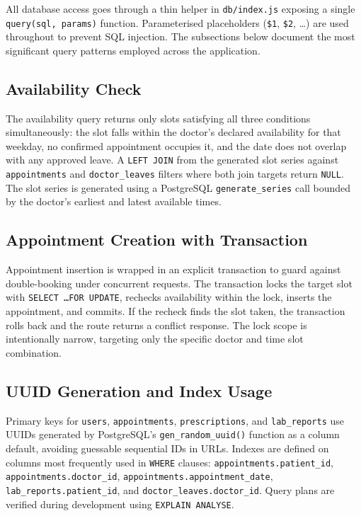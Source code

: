\justifying
\noindent All database access goes through a thin helper in \texttt{db/index.js} exposing a single \texttt{query(sql, params)} function. Parameterised placeholders (\texttt{\$1}, \texttt{\$2}, \ldots) are used throughout to prevent SQL injection. The subsections below document the most significant query patterns employed across the application.

\subsection{Availability Check}

\justifying
\noindent The availability query returns only slots satisfying all three conditions simultaneously: the slot falls within the doctor's declared availability for that weekday, no confirmed appointment occupies it, and the date does not overlap with any approved leave. A \texttt{LEFT JOIN} from the generated slot series against \texttt{appointments} and \texttt{doctor\_leaves} filters where both join targets return \texttt{NULL}. The slot series is generated using a PostgreSQL \texttt{generate\_series} call bounded by the doctor's earliest and latest available times.

\subsection{Appointment Creation with Transaction}

\justifying
\noindent Appointment insertion is wrapped in an explicit transaction to guard against double-booking under concurrent requests. The transaction locks the target slot with \texttt{SELECT \ldots FOR UPDATE}, rechecks availability within the lock, inserts the appointment, and commits. If the recheck finds the slot taken, the transaction rolls back and the route returns a conflict response. The lock scope is intentionally narrow, targeting only the specific doctor and time slot combination.

\subsection{UUID Generation and Index Usage}

\justifying
\noindent Primary keys for \texttt{users}, \texttt{appointments}, \texttt{prescriptions}, and \texttt{lab\_reports} use UUIDs generated by PostgreSQL's \texttt{gen\_random\_uuid()} function as a column default, avoiding guessable sequential IDs in URLs. Indexes are defined on columns most frequently used in \texttt{WHERE} clauses: \texttt{appointments.patient\_id}, \texttt{appointments.doctor\_id}, \texttt{appointments.appointment\_date}, \texttt{lab\_reports.patient\_id}, and \texttt{doctor\_leaves.doctor\_id}. Query plans are verified during development using \texttt{EXPLAIN ANALYSE}.

